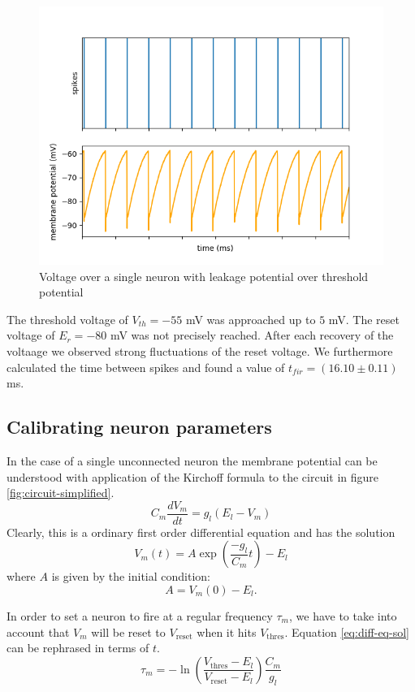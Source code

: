 \documentclass[a4paper,twocolumn]{article}
\begin{document}
\begin{figure}[ht]
    \centering
    \includegraphics[width=.5\textwidth]{figures/fp_task1_1membrane.png}
    \caption{Voltage over a single neuron with leakage potential over threshold potential}
    \label{fig:membranes_ex1}
\end{figure}

The threshold voltage of $V_{th} = -55$ mV was approached up to $5$ mV.  The 
reset voltage of $E_r = -80$ mV was not precisely reached.  After each recovery 
of the voltaage we observed strong fluctuations of the reset voltage.  We 
furthermore calculated the time between spikes and found a value of 
$t_{fir} = (16.10\pm 0.11)$ ms.
\subsection{Calibrating neuron parameters}

In the case of a single unconnected neuron the membrane potential can be
understood with application of the Kirchoff formula to the circuit in figure
\ref{fig:circuit-simplified}.
\[
    C_m \frac{dV_m}{dt} = g_l(E_l - V_m)
\]
Clearly, this is a ordinary first order differential equation and has the
solution
\begin{equation}
    V_m(t) = A \exp(\frac{-g_l}{C_m}t) - E_l
    \label{eq:diff-eq-sol}
\end{equation}
where $A$ is given by the initial condition:
\[
    A = V_m(0) - E_l.
\]

In order to set a neuron to fire at a regular frequency $\tau_m$, we have to take
into account that $V_m$ will be reset to $V_\text{reset}$ when it hits
$V_\text{thres}$. Equation \eqref{eq:diff-eq-sol} can be rephrased in terms of
$t$.
\[
    \tau_m = -\ln(\frac{V_\text{thres} - E_l}{V_\text{reset} - E_l})
    \frac{C_m}{g_l}
\]
\end{document}
